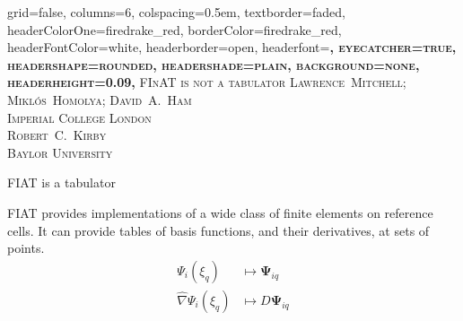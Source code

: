 \documentclass[a0paper,portrait]{baposter}
\begin{document}
\begin{poster}{
    grid=false,
    columns=6,
    colspacing=0.5em,
    textborder=faded,
    headerColorOne=firedrake_red,
    borderColor=firedrake_red,
    headerFontColor=white,
    headerborder=open,
    headerfont=\bfseries\Large\scshape,
    eyecatcher=true,
    headershape=rounded,
    headershade=plain,
    background=none,
    headerheight=0.09\textheight,
  }
  {
  } 
  {\scshape\Large FInAT is not a tabulator}
  {\small\scshape Lawrence~Mitchell; Mikl\'os~Homolya; David~A.~Ham\\[0.1em]Imperial College London
    \\[0.4em]  
    Robert~C.~Kirby\\[0.1em]Baylor University}
  {
  }

  \begin{posterbox}[name=introduction,span=6,column=0,row=0]{FIAT is a
      tabulator}
    \begin{multicols}{2}
      {\raggedright FIAT provides implementations of a wide class of
      finite elements on reference cells. It can provide tables of basis
      functions, and their derivatives, at sets of points.
      \vspace{-0.5\baselineskip}
      \begin{align*}
        \Psi_i(\xi_q) &\mapsto \mathbf{\Psi}_{iq}\\
        \hat{\nabla}\Psi_i(\xi_q) &\mapsto D\mathbf{\Psi}_{iq}
      \end{align*}
      \columnbreak
      
}
\end{multicols}
\end{posterbox}
\end{poster}
\end{document}
